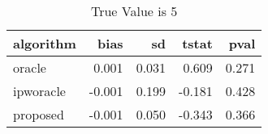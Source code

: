 \begin{table}[h!]
\caption{True Value is 5}
\centering
\begin{tabular}[t]{lrrrr}
\toprule
algorithm & bias & sd & tstat & pval\\
\midrule
oracle & 0.001 & 0.031 & 0.609 & 0.271\\
ipworacle & -0.001 & 0.199 & -0.181 & 0.428\\
proposed & -0.001 & 0.050 & -0.343 & 0.366\\
\bottomrule
\end{tabular}
\end{table}
